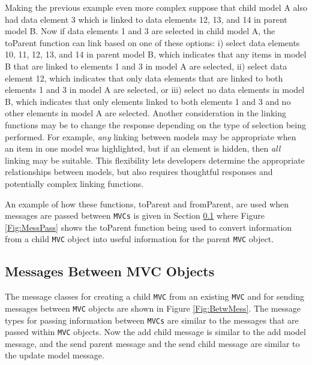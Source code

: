 \documentclass{article}[11pt]
\newcommand{\Rfunction}[1]{{\textsf{#1}}}
\newcommand{\Robject}[1]{{\texttt{#1}}}
\begin{document}
Making the previous example even more complex suppose that child model A also
had data element 3 which is linked to data elements 12, 13, and 14 in parent
model B.  Now if data elements 1 and 3 are selected in child model A, the
\Rfunction{toParent} function can link based on one of these options: i) select
data elements 10, 11, 12, 13, and 14 in parent model B, which indicates that
any items in model B that are linked to elements 1 and 3 in model A are
selected, ii) select data element 12, which indicates that only data elements
that are linked to both elements 1 and 3 in model A are selected, or iii)
select no data elements in model B, which indicates that only elements linked
to both elements 1 and 3 and no other elements in model A are selected.
Another consideration in the linking functions may be to change the response
depending on the type of selection being performed.  For example, \textit{any}
linking between models may be appropriate when an item in one model was
highlighted, but if an element is hidden, then \textit{all} linking may be
suitable.  This flexibility lets developers determine the appropriate
relationships between models, but also requires thoughtful responses and
potentially complex linking functions.

An example of how these functions, \Rfunction{toParent} and
\Rfunction{fromParent}, are used when messages are passed between
\Robject{MVCs} is given in Section \ref{Ssec:MultMess} where Figure
\ref{Fig:MessPass} shows the \Rfunction{toParent} function being used to
convert information from a child \Robject{MVC} object into useful information
for the parent \Robject{MVC} object.

\subsection{Messages Between MVC Objects}
\label{Ssec:MultMess}

The message classes for creating a child \Robject{MVC} from an existing
\Robject{MVC} and for sending messages between \Robject{MVC} objects are shown
in Figure \ref{Fig:BetwMess}.  The message types for passing information
between \Robject{MVCs} are similar to the messages
that are passed within \Robject{MVC} objects.  Now the add child message is
similar to the add model message, and the send parent message and the send
child message are similar to the update model message.
\end{document}

